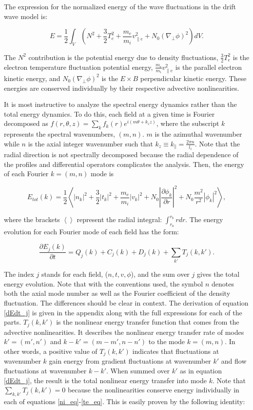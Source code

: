 \documentclass[showpacs,preprintnumbers,amsmath,amssymb,superscriptaddress]{revtex4}
\def\beq{\begin{equation}}
\def\eeq{\end{equation}}
\def\para{\parallel}
\newcommand{\pdiff}[2]{\frac{\partial#1}{\partial#2}}
\def\grad{\nabla}
\newcommand{\gradperp}{\grad_\perp}
\newcommand{\vpe}{v_{\parallel e}}
\begin{document}
The expression for the normalized energy of the wave fluctuations in the drift wave model is:

\beq
\label{energy_eq}
E = \frac{1}{2} \int_V  (N^2 + \frac{3}{2} T_e^2 + \frac{m_e}{m_i} \vpe^2 + N_0 (\gradperp \phi)^2 ) dV.
\eeq

The $N^2$ contribution is the potential energy due to density fluctuations, $\frac{3}{2} T_e^2$ is the electron temperature fluctuation potential energy,
$\frac{m_e}{m_i} \vpe^2$ is the parallel electron kinetic energy, and $N_0 (\gradperp \phi)^2$ is the $E \times B$ perpendicular kinetic energy.
These energies are conserved individually by their respective advective nonlinearities.

It is most instructive to analyze the spectral energy dynamics rather than the total energy dynamics. To do this, each field at a given time is Fourier decomposed as 
$f(r,\theta,z) = \sum_k f_k(r) e^{i (m \theta + k_z z )}$,
where the subscript $k$ represents the spectral wavenumbers, $(m,n)$. $m$ is the azimuthal wavenumber while $n$ is the axial integer wavenumber such that $k_z \equiv k_\para = \frac{2 \pi n}{l_z}$. 
Note that the radial direction is not spectrally decomposed because the radial dependence of the profiles and differential operators complicates the analysis.
Then, the energy of each Fourier $k = (m,n)$ mode is

\beq
\label{E_k}
E_{tot}(k) = \frac{1}{2} \left< |n_k|^2 + \frac{3}{2} |t_k|^2 + \frac{m_e}{m_i} |v_k|^2 + N_0 \left| \pdiff{\phi_k}{r} \right|^2 + N_0 \frac{m^2}{r^2} |\phi_k|^2 \right>,
\eeq

where the brackets $\left< \right>$ represent the radial integral: $\int_{r_a}^{r_b} r dr$. 
The energy evolution for each Fourier mode of each field has the form:

\beq
\label{dEdt_j}
\pdiff{E_{j}(k)}{t} = Q_{j}(k) + C_{j}(k) + D_j(k) + \sum_{k'} T_{j}(k,k').
\eeq

The index $j$ stands for each field, ($n,t,v,\phi$), and the sum over $j$ gives the total energy evolution. Note that with the conventions used, the symbol $n$ denotes both the axial mode number as
well as the Fourier coefficient of the density fluctuation. The differences should be clear in context. The derivation of equation \ref{dEdt_j} 
is given in the appendix along with the full expressions for each of the parts. $T_{j}(k,k')$ is the nonlinear energy transfer function that comes from the advective
nonlinearities.  It describes the nonlinear energy transfer rate of modes $k'=(m',n')$ and $k-k'=(m-m',n-n')$ to the mode $k=(m,n)$. 
In other words, a positive value of $T_{j}(k,k')$ indicates that fluctuations
at wavenumber $k$ gain energy from gradient fluctuations at wavenumber $k'$ and flow fluctuations at wavenumber $k-k'$.
When summed over $k'$ as in equation \ref{dEdt_j}, the result is the total
nonlinear energy transfer into mode $k$. Note that $\sum_{k,k'} T_{j}(k,k') = 0$ because the nonlinearities conserve energy individually in each of equations \ref{ni_eq}-\ref{te_eq}.
This is easily proven by the following identity:
\end{document}
